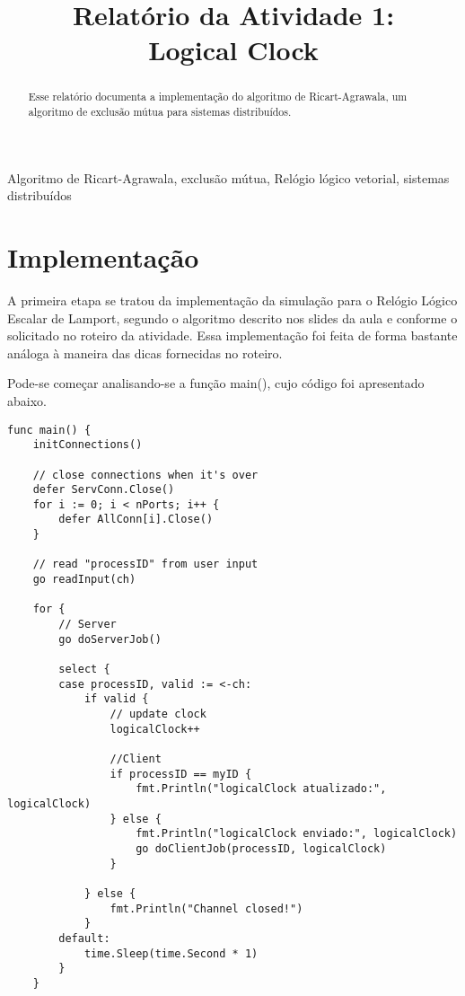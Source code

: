 \documentclass[conference]{IEEEtran}
\begin{document}
\title{Relatório da Atividade 1: \\ Logical Clock\\
}

\author{
}

\maketitle

\begin{abstract}
Esse relatório documenta a implementação do algoritmo de Ricart-Agrawala, um algoritmo de exclusão mútua para sistemas distribuídos.
\end{abstract}

\begin{IEEEkeywords}
Algoritmo de Ricart-Agrawala, exclusão mútua, Relógio lógico vetorial, sistemas distribuídos
\end{IEEEkeywords}

\section{Implementação}
	
	A primeira etapa se tratou da implementação da simulação para o Relógio Lógico Escalar de Lamport, segundo o algoritmo descrito nos slides da aula e conforme o solicitado no roteiro da atividade. Essa implementação foi feita de forma bastante análoga à maneira das dicas fornecidas no roteiro.
	
	Pode-se começar analisando-se a função main(), cujo código foi apresentado abaixo.
	
\begin{lstlisting}
func main() {
	initConnections()

	// close connections when it's over
	defer ServConn.Close()
	for i := 0; i < nPorts; i++ {
		defer AllConn[i].Close()
	}

	// read "processID" from user input
	go readInput(ch)

	for {
		// Server
		go doServerJob()
		
		select {
		case processID, valid := <-ch:
			if valid {
				// update clock
				logicalClock++
				
				//Client
				if processID == myID {
					fmt.Println("logicalClock atualizado:", logicalClock)
				} else {
					fmt.Println("logicalClock enviado:", logicalClock)
					go doClientJob(processID, logicalClock)
				}

			} else {
				fmt.Println("Channel closed!")
			}
		default:
			time.Sleep(time.Second * 1)
		}
	}
\end{lstlisting}
\end{document}
